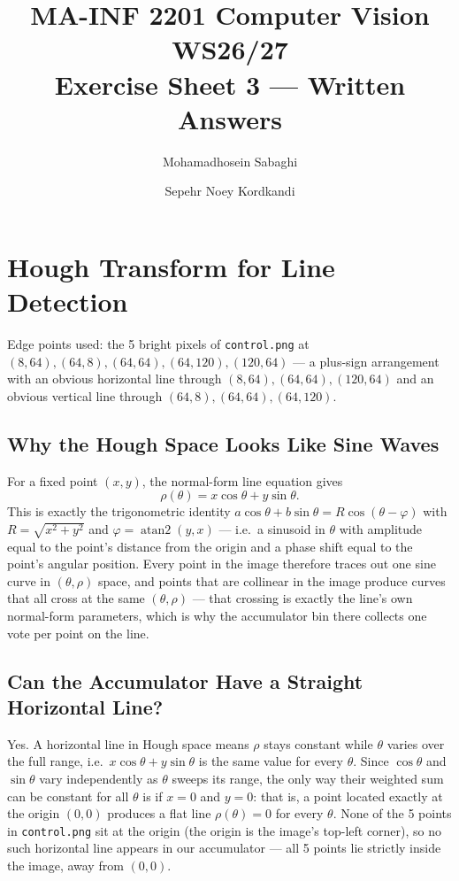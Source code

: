 \documentclass[11pt]{article}
\title{MA-INF 2201 Computer Vision WS26/27 \\ Exercise Sheet 3 --- Written Answers}
\author{Mohamadhosein Sabaghi \and Sepehr Noey Kordkandi}
\date{}
\begin{document}
\maketitle

\section{Hough Transform for Line Detection}

Edge points used: the 5 bright pixels of \texttt{control.png} at
$(8,64), (64,8), (64,64), (64,120), (120,64)$ --- a plus-sign arrangement with an
obvious horizontal line through $(8,64),(64,64),(120,64)$ and an obvious vertical
line through $(64,8),(64,64),(64,120)$.

\subsection{Why the Hough Space Looks Like Sine Waves}

For a fixed point $(x,y)$, the normal-form line equation gives
\[
\rho(\theta) = x\cos\theta + y\sin\theta.
\]
This is exactly the trigonometric identity $a\cos\theta + b\sin\theta = R\cos(\theta-\varphi)$
with $R=\sqrt{x^2+y^2}$ and $\varphi=\operatorname{atan2}(y,x)$ --- i.e.\ a sinusoid in
$\theta$ with amplitude equal to the point's distance from the origin and a phase shift
equal to the point's angular position. Every point in the image therefore traces out one
sine curve in $(\theta,\rho)$ space, and points that are collinear in the image produce
curves that all cross at the same $(\theta,\rho)$ --- that crossing is exactly the line's
own normal-form parameters, which is why the accumulator bin there collects one vote per
point on the line.

\subsection{Can the Accumulator Have a Straight Horizontal Line?}

Yes. A horizontal line in Hough space means $\rho$ stays constant while $\theta$ varies
over the full range, i.e.\ $x\cos\theta + y\sin\theta$ is the same value for every $\theta$.
Since $\cos\theta$ and $\sin\theta$ vary independently as $\theta$ sweeps its range, the only
way their weighted sum can be constant for all $\theta$ is if $x=0$ and $y=0$: that is, a point
located exactly at the origin $(0,0)$ produces a flat line $\rho(\theta)=0$ for every $\theta$.
None of the 5 points in \texttt{control.png} sit at the origin (the origin is the image's
top-left corner), so no such horizontal line appears in our accumulator --- all 5 points lie
strictly inside the image, away from $(0,0)$.
\end{document}
